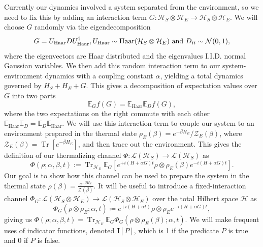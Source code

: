 \documentclass{article}
\newcommand{\haar}{\text{Haar}}
\newcommand{\brackets}[1]{\left[ #1 \right]}
\DeclareMathOperator{\Tr}{Tr}
\newcommand{\trace}[1]{\Tr \brackets{ #1 }}
\newcommand{\hilb}{\mathcal{H}}
\newcommand{\partfun}{\mathcal{Z}}
\begin{document}
Currently our dynamics involved a system separated from the environment, so we need to fix this by adding an interaction term $G : \hilb_S \otimes \hilb_E \to \hilb_S \otimes \hilb_E$. We will choose $G$ randomly via the eigendecomposition 
\begin{equation}
    G = U_{\haar} D U_{\haar}^\dagger, U_{\haar} \sim {\rm Haar}(\hilb_S \otimes \hilb_E) \text{ and } D_{ii} \sim \mathcal{N}(0,1), \label{eq:interaction_def}
\end{equation}
where the eigenvectors are Haar distributed and the eigenvalues I.I.D. normal Gaussian variables. We then add this random interaction term to our system-environment dynamics with a coupling constant $\alpha$, yielding a total dynamics governed by $H_S + H_E + G$. This gives a decomposition of expectation values over $G$ into two parts 
\begin{equation}
    \mathbb{E}_G f(G) = \mathbb{E}_{\haar} \mathbb{E}_{D} f(G),
\end{equation}
where the two expectations on the right commute with each other $\mathbb{E}_{\haar} \mathbb{E}_{D} = \mathbb{E}_{D} \mathbb{E}_{\haar} $. We will use this interaction term to couple our system to an environment prepared in the thermal state $\rho_E(\beta) = e^{-\beta H_E} /\partfun_E(\beta)$, where $\partfun_E(\beta) = \trace{e^{-\beta H_E}}$, and then trace out the environment. This gives the definition of our thermalizing channel $\Phi : \mathcal{L}(\hilb_S) \to \mathcal{L}(\hilb_S)$ as
\begin{equation}\label{eq:PhiDef}
    \Phi(\rho ; \alpha, \beta, t) :=  \Tr_{\hilb_E} \mathbb{E}_{G} \left[ e^{+i(H + \alpha G)t} \rho \otimes \rho_E(\beta) e^{-i(H + \alpha G) t}\right].
\end{equation}
Our goal is to show how this channel can be used to prepare the system in the thermal state $\rho(\beta) = \frac{e^{-\beta H_S}}{\partfun(\beta)}$. It will be useful to introduce a fixed-interaction channel $\Phi_G : \mathcal{L}(\hilb_S \otimes \hilb_E) \to \mathcal{L}(\hilb_S \otimes \hilb_E)$ over the total Hilbert space $\hilb$ as 
\begin{equation}
    \Phi_G(\rho \otimes \rho_E; \alpha, t) \coloneqq e^{+i(H + \alpha t)} \rho \otimes \rho_E e^{- i(H + \alpha G)t}, \label{eq:phi_g_definition}
\end{equation}
giving us $\Phi(\rho; \alpha, \beta, t) = \Tr_{\hilb_E} \mathbb{E}_G \Phi_G(\rho \otimes \rho_E(\beta); \alpha, t)$. We will make frequent uses of indicator functions, denoted $\mathbf{I}[P]$, which is 1 if the predicate $P$ is true and 0 if $P$ is false.
\end{document}
